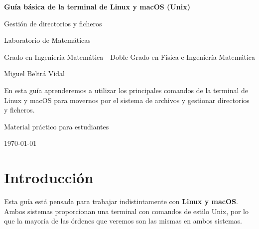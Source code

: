 \documentclass[11pt,a4paper]{article}
\begin{document}
\begin{titlepage}
    \centering


    \vspace*{2cm}


    {\Huge\bfseries Guía básica de la terminal de Linux y macOS (Unix)\par}


    \vspace{1cm}


    {\Large Gestión de directorios y ficheros\par}


    \vspace{1cm}
    
    {\Large Laboratorio de Matemáticas\par}


    \vspace{1cm}


	{Grado en Ingeniería Matemática - Doble Grado en Física e Ingeniería Matemática\par}


    \vspace{1cm}


    {\Large Miguel Beltrá Vidal\par}


    \vfill


    \begin{tcolorbox}[width=0.8\textwidth]
    En esta guía aprenderemos a utilizar los principales comandos
    de la terminal de Linux y macOS para movernos por el sistema de archivos
    y gestionar directorios y ficheros.
    \end{tcolorbox}


    \vfill


    {\large Material práctico para estudiantes\par}


    \vspace{0.5cm}


    {\large \today\par}


\end{titlepage}


\tableofcontents
\newpage


\section{Introducción}
\noindent Esta guía está pensada para trabajar indistintamente con
\textbf{Linux y macOS}. Ambos sistemas proporcionan una terminal con
comandos de estilo Unix, por lo que la mayoría de las órdenes que veremos
son las mismas en ambos sistemas.
\end{document}
